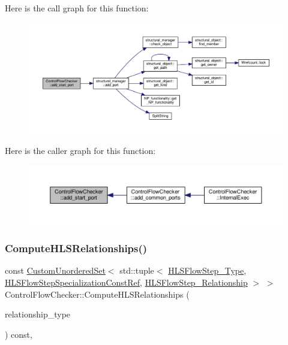 Here is the call graph for this function\+:
\nopagebreak
\begin{figure}[H]
\begin{center}
\leavevmode
\includegraphics[width=350pt]{d0/dea/classControlFlowChecker_a8f2801e5c890005e2a9dcf43bd9c03de_cgraph}
\end{center}
\end{figure}
Here is the caller graph for this function\+:
\nopagebreak
\begin{figure}[H]
\begin{center}
\leavevmode
\includegraphics[width=350pt]{d0/dea/classControlFlowChecker_a8f2801e5c890005e2a9dcf43bd9c03de_icgraph}
\end{center}
\end{figure}
\mbox{\label{classControlFlowChecker_ac192ee094e00ea4866d13a6b057da879}} 
\subsubsection{\texorpdfstring{Compute\+H\+L\+S\+Relationships()}{ComputeHLSRelationships()}}
{\footnotesize\ttfamily const \hyperlink{classCustomUnorderedSet}{Custom\+Unordered\+Set}$<$ std\+::tuple$<$ \hyperlink{hls__step_8hpp_ada16bc22905016180e26fc7e39537f8d}{H\+L\+S\+Flow\+Step\+\_\+\+Type}, \hyperlink{hls__step_8hpp_a5fdd2edf290c196531d21d68e13f0e74}{H\+L\+S\+Flow\+Step\+Specialization\+Const\+Ref}, \hyperlink{hls__step_8hpp_a3ad360b9b11e6bf0683d5562a0ceb169}{H\+L\+S\+Flow\+Step\+\_\+\+Relationship} $>$ $>$ Control\+Flow\+Checker\+::\+Compute\+H\+L\+S\+Relationships (\begin{DoxyParamCaption}\item[{const \hyperlink{classDesignFlowStep_a723a3baf19ff2ceb77bc13e099d0b1b7}{Design\+Flow\+Step\+::\+Relationship\+Type}}]{relationship\+\_\+type }\end{DoxyParamCaption}) const\hspace{0.3cm}{\ttfamily [protected]}, {\ttfamily [virtual]}}



